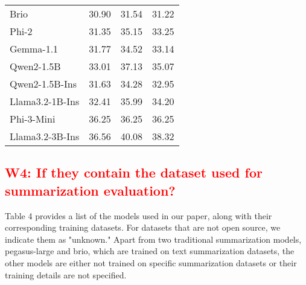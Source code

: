 \documentclass[a4paper]{article}
\begin{document}
\begin{table}[h]
\begin{tabular}{lccc}
Brio                 & 30.90                       & 31.54                      & 31.22                       \\
Phi-2                & 31.35                       & 35.15                      & 33.25                       \\
Gemma-1.1            & 31.77                       & 34.52                      & 33.14                       \\
Qwen2-1.5B           & 33.01                       & 37.13                      & 35.07                       \\
Qwen2-1.5B-Ins       & 31.63                       & 34.28                      & 32.95                       \\
Llama3.2-1B-Ins      & 32.41                       & 35.99                      & 34.20                       \\
Phi-3-Mini           & 36.25                       & 36.25                      & 36.25                       \\
Llama3.2-3B-Ins      & 36.56                       & 40.08                      & 38.32    \\          
\hline
\end{tabular}
\end{table}



\subsection{\textcolor{red}{W4: If they contain the dataset used for summarization evaluation?}}

Table 4 provides a list of the models used in our paper, along with their corresponding training datasets. For datasets that are not open source, we indicate them as "unknown." Apart from two traditional summarization models, pegasus-large and brio, which are trained on text summarization datasets, the other models are either not trained on specific summarization datasets or their training details are not specified.
\end{document}

